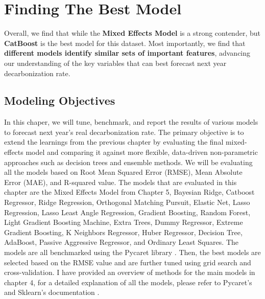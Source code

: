 \chapter{Finding The Best Model}

\begin{keytakeaway}
    Overall, we find that while the \textbf{Mixed Effects Model} is a strong contender, but \textbf{CatBoost} is the best model for this dataset. Most importantly, we find that \textbf{different models identify similar sets of important features}, advancing our understanding of the key variables that can best forecast next year decarbonization rate.
\end{keytakeaway}



\section{Modeling Objectives}
In this chaper, we will tune, benchmark, and report the results of various models to forecast next year's real decarbonization rate. The primary objective is to extend the learnings from the previous chapter by evaluating the final mixed-effects model and comparing it against more flexible, data-driven non-parametric approaches such as decision trees and ensemble methods. We will be evaluating all the models based on Root Mean Squared Error (RMSE), Mean Absolute Error (MAE), and R-squared value. The models that are evaluated in this chapter are the Mixed Effects Model from Chapter 5,  Bayesian Ridge, Catboost Regressor, Ridge Regression, Orthogonal Matching Pursuit, Elastic Net, Lasso Regression, Lasso Least Angle Regression, Gradient Boosting, Random Forest, Light Gradient Boosting Machine, Extra Trees, Dummy Regressor, Extreme Gradient Boosting, K Neighbors Regressor, Huber Regressor, Decision Tree, AdaBoost, Passive Aggressive Regressor, and Ordinary Least Squares. The models are all benchmarked using the Pycaret library \cite{pycaret}. Then, the best models are selected based on the RMSE value and are further tuned using grid search and cross-validation. I have provided an overview of methods for the main models in chapter 4, for a detailed explanation of all the models, please refer to Pycaret's and Sklearn's documentation \cite{pycaret,scikit-learn}.


